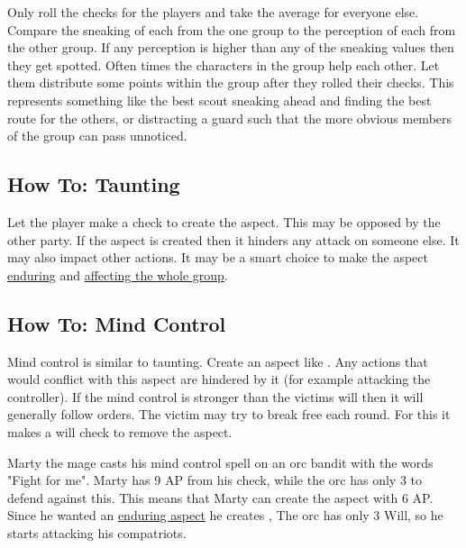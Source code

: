 \documentclass[11pt]{article}
\begin{document}
{Only roll the checks for the players and take the average for everyone else. Compare the sneaking of each from the one group to the perception of each from the other group. If any perception is higher than any of the sneaking values then they get spotted.
Often times the characters in the group help each other. Let them distribute some points within the group after they rolled their checks. This represents something like the best scout sneaking ahead and finding the best route for the others, or distracting a guard such that the more obvious members of the group can pass unnoticed.
\subsection{How To: Taunting}
\label{sec:org7bdb55a}
Let the player make a check to create the  aspect. This may be opposed by the other party. If the aspect is created then it hinders any attack on someone else. It may also impact other actions. It may be a smart choice to make the  aspect \hyperref[sec:orgdf4d4d8]{enduring} and \hyperref[sec:org2253c8e]{affecting the whole group}. 
\subsection{How To: Mind Control}
\label{sec:orgb8825ef}
Mind control is similar to taunting. Create an aspect like . Any actions that would conflict with this aspect are hindered by it (for example attacking the controller). If the mind control is stronger than the victims will then it will generally follow orders. The victim may try to break free each round. For this it makes a will check to remove the  aspect.

\begin{pwexample}
Marty the mage casts his mind control spell on an orc bandit with the words "Fight for me". Marty has 9 AP from his check, while the orc has only 3 to defend against this. This means that Marty can create the aspect with 6 AP. Since he wanted an \hyperref[sec:orgdf4d4d8]{enduring aspect} he creates , The orc has only 3 Will, so he starts attacking his compatriots. 
\end{pwexample}
}
\end{document}
